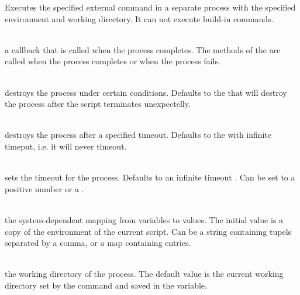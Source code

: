 %


Executes the specified external command in a separate process with the
specified environment and working directory. It can not execute build-in commands.

\begin{asparaitem}
%
\item[\code{handler: ExecuteResultHandler}] \hfill \\
a callback that is called when the process completes. 
The methods of the \cite{executeresulthandler13} 
are called when the process completes or when the process fails.
%
\item[\code{destroyer: ProcessDestroyer}] \hfill \\
\cite{processdestroyer13}  destroys the process under certain conditions.
Defaults to the \cite{shutdownhookprocessdestroyer13}
that will destroy the process after the script terminates unexpectelly.
%
\item[\code{watchdog}] \hfill \\
destroys the process after a specified timeout. Defaults to 
the \cite{executewatchdog13} with infinite timeput, i.e.
it will never timeout.
%
\item[\code{timeout: (+)number|duration}] \hfill \\
sets the timeout for the process. Defaults to an infinite 
timeout  . Can be set to a positive
number or a \cite{duration13}.
%
\item[\code{env}] \hfill \\
the system-dependent mapping from variables
to values. The initial value is a copy of the environment of the current
script. Can be a string containing  tupels
separated by a comma, or a map containing  entries.
%
\item[\code{dir}] \hfill \\
the working directory of the process. The default value
is the current working directory set by the  command
and saved in the  variable.
%
\end{asparaitem}

